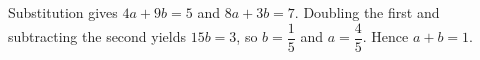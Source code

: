 Substitution gives $4a+9b=5$ and $8a+3b=7$. Doubling the first and subtracting the second yields $15b=3$, so $b=\dfrac{1}{5}$ and $a=\dfrac{4}{5}$. Hence $\boxed{a+b=1}$.
